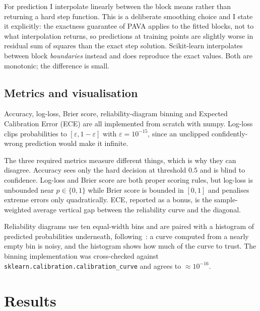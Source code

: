\documentclass[11pt,a4paper]{article}
\begin{document}
For prediction I interpolate linearly between the block means rather than returning a hard step function.
This is a deliberate smoothing choice and I state it explicitly: the exactness guarantee of PAVA applies to
the fitted blocks, not to what interpolation returns, so predictions at training points are slightly worse
in residual sum of squares than the exact step solution. Scikit-learn interpolates between block
\emph{boundaries} instead and does reproduce the exact values. Both are monotonic; the difference is small.

\subsection{Metrics and visualisation}

Accuracy, log-loss, Brier score, reliability-diagram binning and Expected Calibration Error (ECE) are all
implemented from scratch with numpy. Log-loss clips probabilities to $[\varepsilon, 1-\varepsilon]$ with
$\varepsilon = 10^{-15}$, since an unclipped confidently-wrong prediction would make it infinite.

The three required metrics measure different things, which is why they can disagree. Accuracy sees only
the hard decision at threshold $0.5$ and is blind to confidence. Log-loss and Brier score are both proper
scoring rules, but log-loss is unbounded near $p \in \{0,1\}$ while Brier score is bounded in $[0,1]$ and
penalises extreme errors only quadratically. ECE, reported as a bonus, is the sample-weighted average
vertical gap between the reliability curve and the diagonal.

Reliability diagrams use ten equal-width bins and are paired with a histogram of predicted probabilities
underneath, following~\cite{nm2005}: a curve computed from a nearly empty bin is noisy, and the histogram
shows how much of the curve to trust. The binning implementation was cross-checked against
\texttt{sklearn.calibration.calibration\_curve} and agrees to $\approx 10^{-16}$.

\section{Results}
\label{sec:results}
\end{document}

